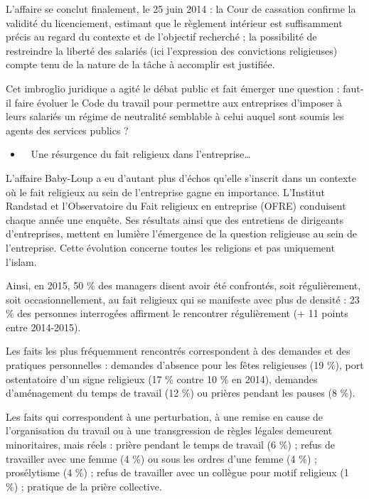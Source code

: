 L'affaire se conclut finalement, le 25 juin 2014 : la Cour de cassation
confirme la validité du licenciement, estimant que le règlement
intérieur est suffisamment précis au regard du contexte et de l'objectif
recherché ; la possibilité de restreindre la liberté des salariés (ici
l'expression des convictions religieuses) compte tenu de la nature de la
tâche à accomplir est justifiée.

Cet imbroglio juridique a agité le débat public et fait émerger une
question : faut-il faire évoluer le Code du travail pour permettre aux
entreprises d'imposer à leurs salariés un régime de neutralité semblable
à celui auquel sont soumis les agents des services publics ?


\begin{itemize}
\item ~
  Une résurgence du fait religieux dans l'entreprise\ldots{}
\end{itemize}


L'affaire Baby-Loup a eu d'autant plus d'échos qu'elle s'inscrit dans un
contexte où le fait religieux au sein de l'entreprise gagne en
importance. L'Institut Randstad et l'Observatoire du Fait religieux en
entreprise (OFRE) conduisent chaque année une enquête. Ses résultats
ainsi que des entretiens de dirigeants d'entreprises, mettent en lumière
l'émergence de la question religieuse au sein de l'entreprise. Cette
évolution concerne toutes les religions et pas uniquement l'islam.

Ainsi, en 2015, 50 \% des managers disent avoir été confrontés, soit
régulièrement, soit occasionnellement, au fait religieux qui se
manifeste avec plus de densité : 23 \% des personnes interrogées
affirment le rencontrer régulièrement (+ 11 points entre 2014-2015).



Les faits les plus fréquemment rencontrés correspondent à des demandes
et des pratiques personnelles : demandes d'absence pour les fêtes
religieuses (19 \%), port ostentatoire d'un signe religieux (17 \%
contre 10 \% en 2014), demandes d'aménagement du temps de travail (12
\%) ou prières pendant les pauses (8 \%).

Les faits qui correspondent à une perturbation, à une remise en cause de
l'organisation du travail ou à une transgression de règles légales
demeurent minoritaires, mais réels : prière pendant le temps de travail
(6 \%) ; refus de travailler avec une femme (4 \%) ou sous les ordres
d'une femme (4 \%) ; prosélytisme (4 \%) ; refus de travailler avec un
collègue pour motif religieux (1 \%) ; pratique de la prière collective.

